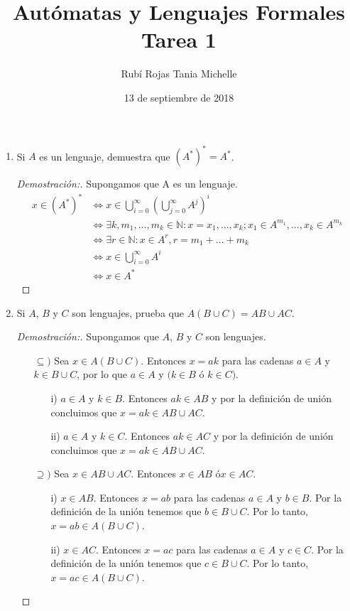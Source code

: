 \documentclass[letterpaper,11pt]{article}
\title{Autómatas y Lenguajes Formales\\ Tarea 1}
\author{Rubí Rojas Tania Michelle}
\date{13 de septiembre de 2018}
\begin{document}
\maketitle

\begin{enumerate}

\item Si $A$ es un lenguaje, demuestra que $(A^{*})^{*} = A^{*}$.
  \begin{proof}[Demostración:]
    Supongamos que A es un lenguaje.
    \begin{align*}
    x \in (A^{*})^{*}  &\Leftrightarrow  
x \in \bigcup\limits_{i=0}^{\infty}(\bigcup\limits_{j=0}^{\infty}  A^{j})^{i} \\
&\Leftrightarrow \exists k, m_1, ..., m_k \in \mathbb{N} : x = x_1, ..., x_k ;  
 x_1 \in A^{m_1}, ..., x_k \in A^{m_k} \\
 &\Leftrightarrow \exists r \in \mathbb{N} : x \in A^{r}, r = m_1 + ... + m_k \\
 &\Leftrightarrow x \in \bigcup\limits_{i=0}^{\infty} A^{i} \\
 &\Leftrightarrow x \in A^{*}
    \end{align*}
  \end{proof}

\item Si $A$, $B$ y $C$ son lenguajes, prueba que $A(B \cup C) = AB \cup AC$.
  \begin{proof}[Demostración:]
    Supongamos que $A$, $B$ y $C$ son lenguajes.
    \begin{itemize}
    \item[$\subseteq)$] Sea $x \in A(B \cup C).$ Entonces $x = ak$ para las
      cadenas $a \in A$ y $k \in B \cup C$, por lo que $a \in A$ y $(k \in B$ ó
      $k \in C)$.
      \begin{itemize}
      \item[i)] $a \in A$ y $k \in B$. Entonces $ak \in AB$ y por la
        definición de unión concluimos que $x = ak \in AB \cup AC$.
      \item[ii)] $a \in A$ y $k \in C$. Entonces $ak \in AC$ y por la
        definición de unión concluimos que $x = ak \in AB \cup AC$.
      \end{itemize}
    \item[$\supseteq)$] Sea $x \in AB \cup AC$. Entonces $x \in AB$ ó$x \in AC$.
      \begin{itemize}
      \item[i)] $x \in AB$. Entonces $x = ab$ para las cadenas  $a \in A$ y
        $b \in B$. Por la definición de la unión tenemos que $b \in B \cup C$.
        Por lo tanto, $x = ab \in A(B \cup C)$.
      \item[ii)] $x \in AC$. Entonces $x = ac$ para las cadenas $a \in A$ y
        $c \in C$. Por la definición de la unión tenemos que $c \in B \cup C$.
        Por lo tanto, $x = ac \in A(B \cup C)$.
    \end{itemize}
    \end{itemize}
    \end{proof}
  

\end{enumerate}
\end{document}
